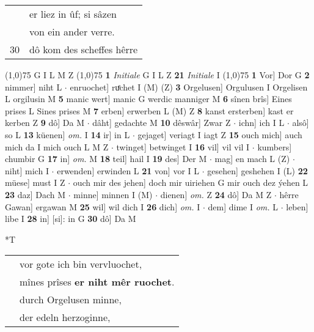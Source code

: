 \documentclass[8pt,a4paper,notitlepage]{article}
\begin{document}
\begin{table}[ht]
\begin{minipage}[t]{0.5\linewidth}
\begin{tabular}{rl}
 & er liez in ûf; si sâzen\\ 
 & von ein ander verre.\\ 
30 & dô kom des scheffes hêrre\\ 
\end{tabular}
\scriptsize
\line(1,0){75} \newline
G I L M Z \newline
\line(1,0){75} \newline
\textbf{1} \textit{Initiale} G I L Z  \textbf{21} \textit{Initiale} I  \newline
\line(1,0){75} \newline
\textbf{1} Vor] Dor G \textbf{2} nimmer] niht L  $\cdot$ enruochet] ruͤchet I (M) (Z) \textbf{3} Orgelusen] Orgulusen I Orgelisen L orgilusin M \textbf{5} manic wert] manic G werdic manniger M \textbf{6} sînen brîs] Eines prises L Sines prises M \textbf{7} erben] erwerben L (M) Z \textbf{8} kanst ersterben] kast er kerben Z \textbf{9} dô] Da M  $\cdot$ dâht] gedachte M \textbf{10} dêswâr] Zwar Z  $\cdot$ ichn] ich I L  $\cdot$ alsô] so L \textbf{13} küenen] \textit{om.} I \textbf{14} ir] in L  $\cdot$ gejaget] veriagt I iagt Z \textbf{15} ouch mich] auch mich da I mich ouch L M Z  $\cdot$ twinget] betwinget I \textbf{16} vil] vil vil I  $\cdot$ kumbers] chumbir G \textbf{17} in] \textit{om.} M \textbf{18} teil] hail I \textbf{19} des] Der M  $\cdot$ mag] en mach L (Z)  $\cdot$ niht] mich I  $\cdot$ erwenden] erwinden L \textbf{21} von] vor I L  $\cdot$ gesehen] geshehen I (L) \textbf{22} müese] must I Z  $\cdot$ ouch mir des jehen] doch mir uiriehen G mir ouch dez ýehen L \textbf{23} daz] Dach M  $\cdot$ minne] minnen I (M)  $\cdot$ dienen] \textit{om.} Z \textbf{24} dô] Da M Z  $\cdot$ hêrre Gawan] ergawan M \textbf{25} wil] wil dich I \textbf{26} dich] \textit{om.} I  $\cdot$ dem] dime I \textit{om.} L  $\cdot$ leben] libe I \textbf{28} in] [si]: in G \textbf{30} dô] Da M \newline
\end{minipage}
\hspace{0.5cm}
\begin{minipage}[t]{0.5\linewidth}
\small
\begin{center}*T
\end{center}
\begin{tabular}{rl}
 & vor gote ich bin vervluochet,\\ 
 & mînes prîses \textbf{er niht mêr ruochet}.\\ 
 & durch Orgelusen minne,\\ 
 & der edeln herzoginne,\\ 

\end{tabular}
\end{minipage}
\end{table}
\end{document}
